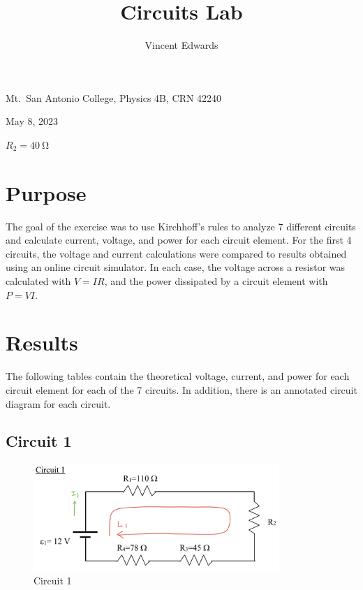\documentclass[12pt]{iopart} %
\gdef\units#1{~\mathrm{#1}}
\begin{document}
\title{Circuits Lab}
\author{Vincent Edwards}
\vspace{10pt}
\begin{indented}
  \item[]Mt.~San Antonio College, Physics 4B, CRN 42240
  \item[]May 8, 2023
  \item[]
  \item[]$R_2 = 40 \units{\Omega}$
\end{indented}
\newpage

\section{Purpose}

The goal of the exercise was to use Kirchhoff's rules to analyze 7 different circuits and calculate current, voltage, and power for each circuit element.
For the first 4 circuits, the voltage and current calculations were compared to results obtained using an online circuit simulator.
In each case, the voltage across a resistor was calculated with $V = IR$, and the power dissipated by a circuit element with $P = VI$.

\section{Results}

The following tables contain the theoretical voltage, current, and power for each circuit element for each of the 7 circuits.
In addition, there is an annotated circuit diagram for each circuit.

\subsection{Circuit 1}

\begin{figure}[htbp]
  \begin{indented}
  \item[]\includegraphics[width=0.83\textwidth]{circuit-1.png}
  \end{indented}
  \caption{\label{fig:circuit_1}
  Circuit 1
  }
\end{figure}
\end{document}
